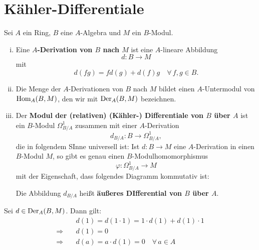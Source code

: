 
\chapter{Kähler-Differentiale}

\begin{defn}
\label{defn:13.1}
	Sei $A$ ein Ring, $B$ eine $A$-Algebra und $M$ ein $B$-Modul.
	\begin{enumerate}[i)]
		\item Eine \textbf{$A$-Derivation von $B$ nach $M$} ist eine $A$-lineare Abbildung
		\[
			d\colon B \to M
		\]
		mit
		\[
			d(fg) = fd(g)+d(f)g \quad \forall\, f,g \in B.
		\]
		\item Die Menge der $A$-Derivationen von $B$ nach $M$ bildet einen $A$-Untermodul von $\operatorname{Hom}_A(B,M)$, den wir mit $\operatorname{Der}_A(B,M)$ bezeichnen.
		\item Der \textbf{Modul der (relativen) (Kähler-) Differentiale von $B$ über $A$} ist ein $B$-Modul $\Omega_{B/A}^1$ zusammen mit einer $A$-Derivation
		\[
			d_{B/A}\colon B \to \Omega_{B/A}^1,
		\]
		die in folgendem SInne universell ist: Ist $d \colon B \to M$ eine $A$-Derivation in einen $B$-Modul $M$, so gibt es genau einen $B$-Modulhomomorphismus
		\[
			\varphi\colon \Omega_{B/A}^1\to M
		\]
		mit der Eigenschaft, dass folgendes Diagramm kommutativ ist:
		\begin{center}
		\end{center}
		Die Abbildung $d_{B/A}$ heißt \textbf{äußeres DIfferential von $B$ über $A$}.
	\end{enumerate}
\end{defn}

\begin{bem}
\label{bem:13.2}
	Sei $d \in \operatorname{Der}_A(B,M)$. Dann gilt:
	\begin{align*}
		&d(1) = d(1\cdot 1) = 1 \cdot d(1)+d(1) \cdot 1\\
		\Longrightarrow\quad & d(1) = 0\\
		\Longrightarrow\quad & d(a) = a \cdot d(1) = 0 \quad \forall\, a \in A
	\end{align*}
	
\end{bem}

